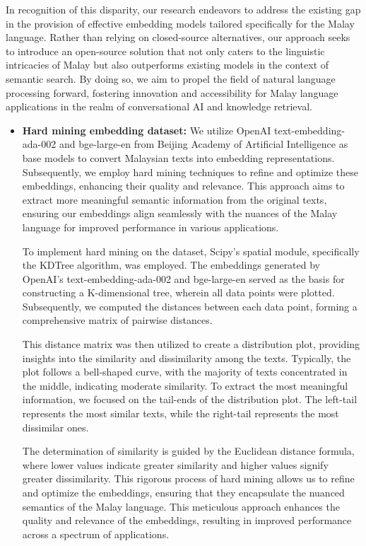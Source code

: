 \documentclass[preprint]{article}
\begin{document}
In recognition of this disparity, our research endeavors to address the existing gap in the provision of effective embedding models tailored specifically for the Malay language. Rather than relying on closed-source alternatives, our approach seeks to introduce an open-source solution that not only caters to the linguistic intricacies of Malay but also outperforms existing models in the context of semantic search. By doing so, we aim to propel the field of natural language processing forward, fostering innovation and accessibility for Malay language applications in the realm of conversational AI and knowledge retrieval.

\begin{itemize}
  \item \textbf{Hard mining embedding dataset:} We utilize OpenAI text-embedding-ada-002 and bge-large-en \cite{bge_embedding} from Beijing Academy of Artificial Intelligence as base models to convert Malaysian texts into embedding representations. Subsequently, we employ hard mining techniques to refine and optimize these embeddings, enhancing their quality and relevance. This approach aims to extract more meaningful semantic information from the original texts, ensuring our embeddings align seamlessly with the nuances of the Malay language for improved performance in various applications.
  
  To implement hard mining on the dataset, Scipy's spatial module, specifically the KDTree algorithm, was employed. The embeddings generated by OpenAI's text-embedding-ada-002 and bge-large-en served as the basis for constructing a K-dimensional tree, wherein all data points were plotted. Subsequently, we computed the distances between each data point, forming a comprehensive matrix of pairwise distances.
  
  This distance matrix was then utilized to create a distribution plot, providing insights into the similarity and dissimilarity among the texts. Typically, the plot follows a bell-shaped curve, with the majority of texts concentrated in the middle, indicating moderate similarity. To extract the most meaningful information, we focused on the tail-ends of the distribution plot. The left-tail represents the most similar texts, while the right-tail represents the most dissimilar ones.
  
  The determination of similarity is guided by the Euclidean distance formula, where lower values indicate greater similarity and higher values signify greater dissimilarity. This rigorous process of hard mining allows us to refine and optimize the embeddings, ensuring that they encapsulate the nuanced semantics of the Malay language. This meticulous approach enhances the quality and relevance of the embeddings, resulting in improved performance across a spectrum of applications.


\end{itemize}
\end{document}
